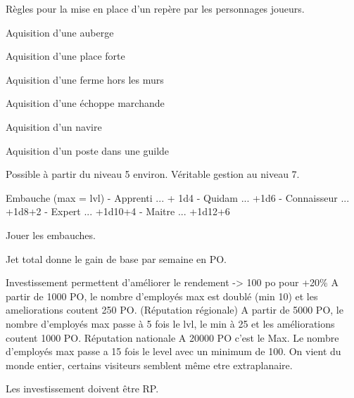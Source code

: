  Règles pour la mise en place d'un repère par les personnages joueurs.

Aquisition d'une auberge

Aquisition d'une place forte

Aquisition d'une ferme hors les murs

Aquisition d'une échoppe marchande

Aquisition d'un navire

Aquisition d'un poste dans une guilde


Possible à partir du niveau 5 environ. Véritable gestion au niveau 7.

Embauche (max = lvl)
 - Apprenti ... + 1d4
 - Quidam ... +1d6
 - Connaisseur ... +1d8+2
 - Expert ... +1d10+4
 - Maitre ... +1d12+6

Jouer les embauches.


Jet total donne le gain de base par semaine en PO.

Investissement permettent d'améliorer le rendement -> 100 po pour +20\%
A partir de 1000 PO, le nombre d'employés max est doublé (min 10) et les
ameliorations coutent 250 PO. (Réputation régionale)
A partir de 5000 PO, le nombre d'employés max passe à 5 fois le lvl, le min
à 25 et les améliorations coutent 1000 PO. Réputation nationale
A 20000 PO c'est le Max. Le nombre d'employés max passe a 15 fois le level
avec un minimum de 100. On vient du monde entier, certains visiteurs 
semblent même etre extraplanaire.

Les investissement doivent être RP.
